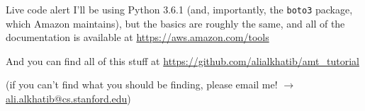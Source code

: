 \documentclass[presentation]{subfiles}
\begin{document}
\begin{frame}{Live code alert}
    I'll be using Python 3.6.1 (and, importantly, the \texttt{boto3} package, which Amazon maintains), but
    the basics are roughly the same, and all of the documentation is available at
    \url{https://aws.amazon.com/tools}

    And you can find all of this stuff at \url{https://github.com/alialkhatib/amt_tutorial}

    (if you can't find what you should be finding, please email me! $\rightarrow$
    \url{ali.alkhatib@cs.stanford.edu})
\end{frame}
\end{document}
